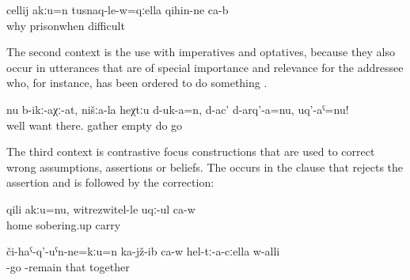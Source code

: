 \begin{exe}
	\ex	\label{ex:Because when you are in prison it is difficult minor}
	\gll	cellij	akːu=n	tusnaq-le-w=qːella	qihin-ne	ca-b\\
		why		prisonwhen	difficult	\\
	\glt	{}
\end{exe}

The second context is the use with imperatives and optatives, because they also occur in utterances that are of special importance and relevance for the addressee who, for instance, has been ordered to do something .

\begin{exe}
	\ex	\label{ex:‎‎‎If you want, take the (stuff) and empty it here in our place, go minor}
	\gll	nu	b-ikː-aχː-at,	nišːa-la	heχtːu	d-uk-a=n,	d-ac'	d-arq'-a=nu,	uq'-aˁ=nu!\\
		well	want		there.	gather	\tsc{npl-}empty	do		go\\
	\glt	{}
\end{exe}

The third context is contrastive focus constructions that are used to correct wrong assumptions, assertions or beliefs. The  occurs in the clause that rejects the assertion and is followed by the correction:

\begin{exe}
	\ex	\label{ex:‎No, not home, they take him to the sobering-up station minor}
	\gll	qili	akːu=nu,	witrezwitel-le	uqː-ul	ca-w\\
		home		sobering.up	carry	\\
	\glt	{}

	\ex	\label{ex:‎No, he is not going towards them, but sitting together with them minor}
	\gll	či-haˁ-q'-uˁn-ne=kːu=n	ka-jž-ib	ca-w	hel-tː-a-cːella	w-alli\\
		-go	-remain		that	together\\
	\glt	{}
\end{exe}

